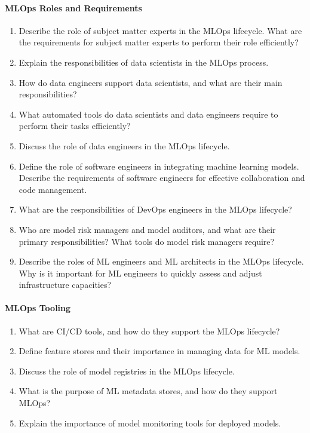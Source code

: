 \paragraph*{MLOps Roles and Requirements}
\begin{enumerate}
    \item Describe the role of subject matter experts in the MLOps lifecycle. What are the requirements for subject matter experts to perform their role efficiently?
    \item Explain the responsibilities of data scientists in the MLOps process.
    \item How do data engineers support data scientists, and what are their main responsibilities?
    \item What automated tools do data scientists and data engineers require to perform their tasks efficiently?
    \item Discuss the role of data engineers in the MLOps lifecycle.
    \item Define the role of software engineers in integrating machine learning models. Describe the requirements of software engineers for effective collaboration and code management.
    \item What are the responsibilities of DevOps engineers in the MLOps lifecycle?
    \item Who are model risk managers and model auditors, and what are their primary responsibilities? What tools do model risk managers require?
    \item Describe the roles of ML engineers and ML architects in the MLOps lifecycle. Why is it important for ML engineers to quickly assess and adjust infrastructure capacities?
\end{enumerate}
\paragraph*{MLOps Tooling}
\begin{enumerate}
    \item What are CI/CD tools, and how do they support the MLOps lifecycle?
    \item Define feature stores and their importance in managing data for ML models.
    \item Discuss the role of model registries in the MLOps lifecycle.
    \item What is the purpose of ML metadata stores, and how do they support MLOps?
    \item Explain the importance of model monitoring tools for deployed models.
\end{enumerate}
